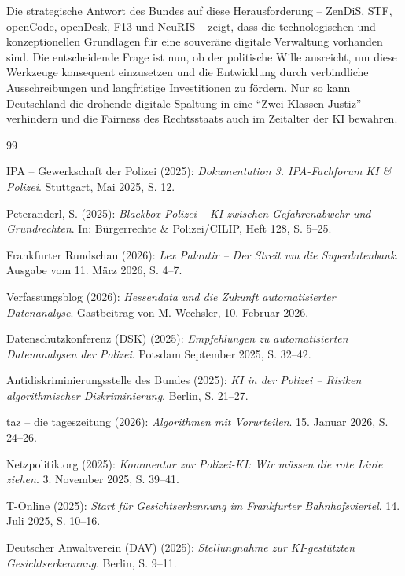 \documentclass[12pt,a4paper]{article}
\begin{document}
	Die strategische Antwort des Bundes auf diese Herausforderung – ZenDiS, STF, openCode, openDesk, F13 und NeuRIS – zeigt, dass die technologischen und konzeptionellen Grundlagen für eine souveräne digitale Verwaltung vorhanden sind. Die entscheidende Frage ist nun, ob der politische Wille ausreicht, um diese Werkzeuge konsequent einzusetzen und die Entwicklung durch verbindliche Ausschreibungen und langfristige Investitionen zu fördern. Nur so kann Deutschland die drohende digitale Spaltung in eine \enquote{Zwei-Klassen-Justiz} verhindern und die Fairness des Rechtsstaats auch im Zeitalter der KI bewahren.
	
	\newpage
	\begin{thebibliography}{99}
		
		 IPA – Gewerkschaft der Polizei (2025): \emph{Dokumentation 3. IPA-Fachforum KI \& Polizei}. Stuttgart, Mai 2025, S. 12.
		
		 Peteranderl, S. (2025): \emph{Blackbox Polizei – KI zwischen Gefahrenabwehr und Grundrechten}. In: Bürgerrechte \& Polizei/CILIP, Heft 128, S. 5–25.
		
		 Frankfurter Rundschau (2026): \emph{Lex Palantir – Der Streit um die Superdatenbank}. Ausgabe vom 11. März 2026, S. 4–7.
		
		 Verfassungsblog (2026): \emph{Hessendata und die Zukunft automatisierter Datenanalyse}. Gastbeitrag von M. Wechsler, 10. Februar 2026.
		
		 Datenschutzkonferenz (DSK) (2025): \emph{Empfehlungen zu automatisierten Datenanalysen der Polizei}. Potsdam September 2025, S. 32–42.
		
		 Antidiskriminierungsstelle des Bundes (2025): \emph{KI in der Polizei – Risiken algorithmischer Diskriminierung}. Berlin, S. 21–27.
		
		 taz – die tageszeitung (2026): \emph{Algorithmen mit Vorurteilen}. 15. Januar 2026, S. 24–26.
		
		 Netzpolitik.org (2025): \emph{Kommentar zur Polizei-KI: Wir müssen die rote Linie ziehen}. 3. November 2025, S. 39–41.
		
		 T-Online (2025): \emph{Start für Gesichtserkennung im Frankfurter Bahnhofsviertel}. 14. Juli 2025, S. 10–16.
		
		 Deutscher Anwaltverein (DAV) (2025): \emph{Stellungnahme zur KI-gestützten Gesichtserkennung}. Berlin, S. 9–11.
		

\end{thebibliography}
\end{document}
